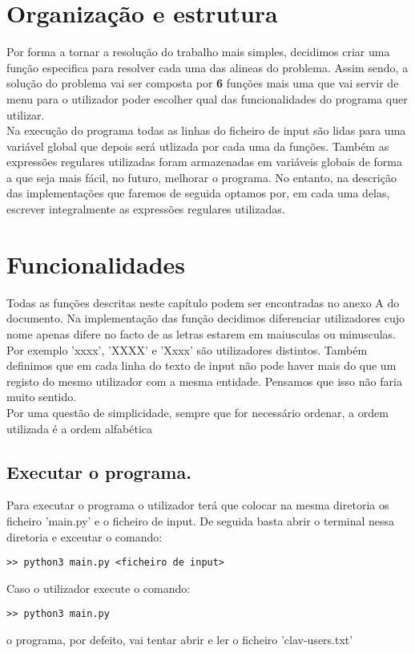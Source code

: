 \documentclass[11pt,a4paper]{report}%
\begin{document}
\section{Organização e estrutura}
Por forma a tornar a resolução do trabalho mais simples, decidimos criar uma função especifica para resolver cada uma das alineas do problema. Assim sendo, a solução do problema vai ser composta por \textbf{6} funções mais uma que vai servir de menu para o utilizador poder escolher qual das funcionalidades do programa quer utilizar.\\
Na execução do programa todas as linhas do ficheiro de input são lidas para uma variável global que depois será utlizada por cada uma da funções. Também as expressões regulares utilizadas foram armazenadas em variáveis globais de forma a que seja mais fácil, no futuro, melhorar o programa. No entanto, na descrição das implementações que faremos de seguida optamos por, em cada uma delas, escrever integralmente as expressões regulares utilizadas. 

\section{Funcionalidades}
Todas as funções descritas neste capítulo podem ser encontradas no anexo A do documento.
Na implementação das função decidimos diferenciar utilizadores cujo nome apenas difere no facto de as letras estarem em maiusculas ou minusculas. Por exemplo 'xxxx', 'XXXX' e 'Xxxx' são  utilizadores distintos.
Também definimos que em cada linha do texto de input não pode haver mais do que um registo do mesmo utilizador com a mesma entidade. Pensamos que isso não faria muito sentido.\\
Por uma questão de simplicidade, sempre que for necessário ordenar, a ordem utilizada é a ordem alfabética
\subsection{Executar o programa.}
Para executar o programa o utilizador terá que colocar na mesma diretoria os ficheiro 'main.py' e o ficheiro de input. De seguida basta abrir o terminal nessa diretoria e exceutar o comando:
\begin{verbatim}
>> python3 main.py <ficheiro de input>
\end{verbatim}
Caso o utilizador execute o comando:
\begin{verbatim}
>> python3 main.py 
\end{verbatim}
o programa, por defeito, vai tentar abrir e ler o ficheiro 'clav-users.txt'
\end{document}
